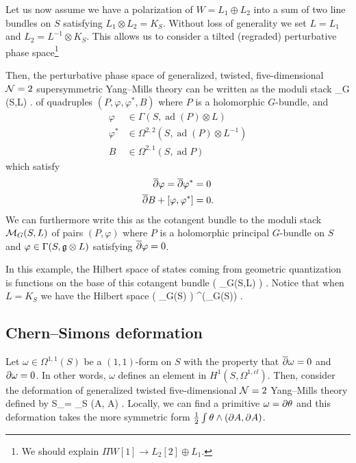 \documentclass[11pt]{amsart}
\renewcommand{\op}{\operatorname}
\begin{document}
Let us now assume we have a polarization of $W = L_1 \oplus L_2$ into a sum of two line bundles on $S$ satisfying $L_1 \otimes L_2 = K_S$.
Without loss of generality we set $L = L_1$ and $L_2 = L^{-1} \otimes K_S$.
This allows us to consider a tilted (regraded) perturbative phase space\footnote{We should explain $\Pi W[1] \to L_2[2] \oplus L_1$.}
\beqn
{}
\eeqn
Then, the perturbative phase space of generalized, twisted, five-dimensional $\mathcal N=2$ supersymmetric Yang--Mills theory can be written as the moduli stack
\beqn
\op{Higgs}_G (S,L) .
\eeqn
of quadruples $(P,\varphi, \varphi^*,B)$ where $P$ is a holomorphic $G$-bundle, and
\begin{align*}
\varphi & \in \Gamma(S, \op{ad}(P) \otimes L) \\
\varphi^* & \in \Omega^{2,2}(S, \op{ad}(P) \otimes L^{-1}) \\
B & \in \Omega^{2,1}(S, \op{ad} P) 
\end{align*}
which satisfy
\begin{align*}
\overline{\partial} \varphi = \overline{\partial} \varphi^* & = 0 \\
\overline{\partial} B + [\varphi, \varphi^*] & = 0 .
\end{align*}
We can furthermore write this as the cotangent bundle to the moduli stack $\mathcal M_{G}(S,L)$ of pairs $(P,\varphi)$ where $P$ is a holomorphic principal $G$-bundle on $S$ and $\varphi \in \Gamma(S, \mathfrak{g} \otimes L)$ satisfying $\overline{\partial} \varphi = 0$.

In this example, the Hilbert space of states coming from geometric quantization is functions on the base of this cotangent bundle
\beqn
\cO \left( \cM_{G}(S,L) \right) .
\eeqn 
Notice that when $L = K_S$ we have the Hilbert space
\beqn
\cO \left( \T[1] \op{Bun}_G(S) \right) \simeq \Omega^{\bu}(\op{Bun}_G(S)) .
\eeqn

\subsection{Chern--Simons deformation}

Let $\omega \in \Omega^{1,1}(S)$ be a $(1,1)$-form on $S$ with the property that $\overline{\partial} \omega = 0$ and $\partial \omega = 0$.
In other words, $\omega$ defines an element in $H^1(S, \Omega^{1,cl})$.
Then, consider the deformation of generalized twisted five-dimensional $\mathcal N=2$ Yang--Mills theory defined by
\beqn
S_\theta =  \int_{\R \times S} \omega \wedge (A, \del A) .
\eeqn
Locally, we can find a primitive $\omega = \partial \theta$ and this deformation takes the more symmetric form $\frac12 \int \theta \wedge (\partial A, \partial A)$.
\end{document}
